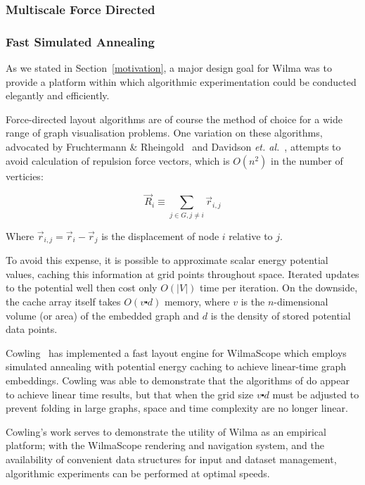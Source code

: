 \documentclass[runningheads]{cl2emult}
\begin{document}
\subsubsection{Multiscale Force Directed}

\subsubsection{Fast Simulated Annealing}

As we stated in Section~\ref{motivation}, a major design goal for Wilma
was to provide a platform within which algorithmic experimentation could be
conducted elegantly and efficiently.

Force-directed layout algorithms are of course the method of choice for a
wide range of graph visualisation problems.  One variation on these
algorithms, advocated by Fruchtermann \&
Rheingold~\cite{fruchtermann90force-directed} and Davidson {\em et.
al.}~\cite{davidson01noise}, attempts to avoid calculation of repulsion force
vectors, which is $O(n^2)$ in the number of verticies:  

\begin{equation}
\vec{R}_i \equiv \sum_{j \in G, j \neq i} \vec{r}_{i,j}
\end{equation}

\noindent Where $\vec{r}_{i,j} = \vec{r}_i - \vec{r}_j$ is the displacement
of node $i$ relative to $j$.

To avoid this expense, it is possible to approximate scalar energy potential
values, caching this information at grid points throughout space.  Iterated
updates to the potential well then cost only $O(|V|)$ time per iteration.  On
the downside, the cache array itself takes $O(v \centerdot d)$ memory, where
$v$ is the $n$-dimensional volume (or area) of the embedded graph and $d$ is
the density of stored potential data points.

Cowling~\cite{cowling02fast} has implemented a fast layout engine for
WilmaScope which employs simulated annealing with potential energy caching
to achieve linear-time graph embeddings.  Cowling was able to demonstrate
that the algorithms of \cite{davidson01noise} do appear to achieve linear
time results, but that when the grid size $v \centerdot d$ must be adjusted to
prevent folding in large graphs, space and time complexity are
no longer linear.

Cowling's work serves to demonstrate the utility of Wilma as an empirical
platform; with the WilmaScope rendering and navigation system, and the
availability of convenient data structures for input and dataset management,
algorithmic experiments can be performed at optimal speeds.
\end{document}
